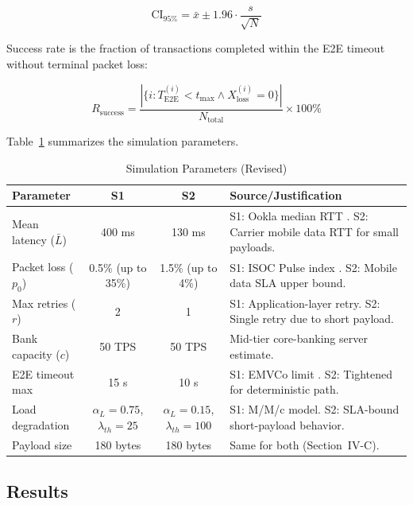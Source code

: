 \documentclass[conference,10pt]{IEEEtran}
\begin{document}
\begin{equation}
\mathrm{CI}_{95\%} = \bar{x} \pm 1.96 \cdot \frac{s}{\sqrt{N}}
\label{eq:ci}
\end{equation}

Success rate is the fraction of transactions completed within the E2E timeout without terminal packet loss:

\begin{equation}
R_{\mathrm{success}} = \frac{|\{i : T^{(i)}_{\mathrm{E2E}} < t_{\max} \wedge X_{\mathrm{loss}}^{(i)} = 0\}|}{N_{\mathrm{total}}} \times 100\%
\label{eq:success}
\end{equation}

Table~\ref{tab:sim_params} summarizes the simulation parameters.

\begin{table}[t]
\caption{Simulation Parameters (Revised)}
\label{tab:sim_params}
\centering
\footnotesize
\begin{tabular}{@{}p{2.8cm}ccp{7.5cm}@{}}
\toprule
\textbf{Parameter} & \textbf{S1} & \textbf{S2} & \textbf{Source/Justification} \\
\midrule
Mean latency ($\bar{L}$) & 400 ms & 130 ms & S1: Ookla median RTT \cite{ookla2024}. S2: Carrier mobile data RTT for small payloads. \\
Packet loss ($p_0$) & 0.5\% (up to 35\%) & 1.5\% (up to 4\%) & S1: ISOC Pulse index \cite{isoc2024}. S2: Mobile data SLA upper bound. \\
Max retries ($r$) & 2 & 1 & S1: Application-layer retry. S2: Single retry due to short payload. \\
Bank capacity ($c$) & 50 TPS & 50 TPS & Mid-tier core-banking server estimate. \\
E2E timeout max & 15 s & 10 s & S1: EMVCo limit \cite{emvco2023}. S2: Tightened for deterministic path. \\
Load degradation & $\alpha_L=0.75$, $\lambda_{th}=25$ & $\alpha_L=0.15$, $\lambda_{th}=100$ & S1: M/M/c model. S2: SLA-bound short-payload behavior. \\
Payload size & 180 bytes & 180 bytes & Same for both (Section~IV-C). \\
\bottomrule
\end{tabular}
\end{table}

\subsection{Results}
\end{document}
